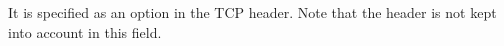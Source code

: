 It is specified as an option in the TCP header. Note that the header is not kept into account in this field.